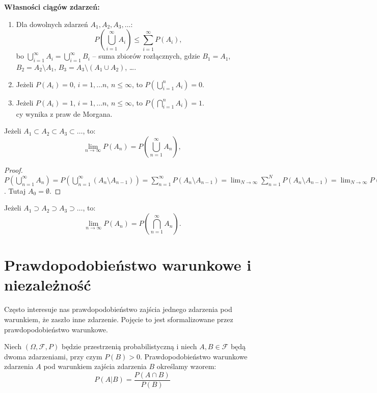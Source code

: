 \documentclass[final,a4paper,openany,12pt]{mwbk}
\begin{document}
\noindent\textbf{Własności ciągów zdarzeń:}
\begin{enumerate}
    \item Dla dowolnych zdarzeń $A_1, A_2, A_3, \dots$:
    \[ P\left(\bigcup_{i=1}^{\infty} A_i\right) \leq \sum_{i=1}^{\infty} P(A_i), \]
    bo $\bigcup_{i=1}^{\infty} A_i = \bigcup_{i=1}^{\infty} B_i$ – suma zbiorów rozłącznych, gdzie
    $B_1 = A_1$, $B_2 = A_2 \setminus A_1$, $B_3 = A_3 \setminus (A_1 \cup A_2)$, \dots.

    \item Jeżeli $P(A_i) = 0$, $i = 1, \dots n$, $n \leq \infty$, to $P\left(\bigcup_{i=1}^{n} A_i\right) = 0$.

    \item Jeżeli $P(A_i) = 1$, $i = 1, \dots n$, $n \leq \infty$, to $P\left(\bigcap_{i=1}^{n} A_i\right) = 1$. \\
    cy wynika z praw de Morgana.
\end{enumerate}

\begin{Tw}
Jeżeli $A_1 \subset A_2 \subset A_3 \subset \dots$, to:
\[ \lim_{n\to\infty} P(A_n) = P\left(\bigcup_{n=1}^{\infty} A_n\right), \]
\end{Tw}
\begin{proof}
$P\left(\bigcup_{n=1}^{\infty} A_n\right) = P\left(\bigcup_{n=1}^{\infty} (A_n \setminus A_{n-1})\right) = \sum_{n=1}^{\infty} P(A_n \setminus A_{n-1}) = \lim_{N\to\infty} \sum_{n=1}^{N} P(A_n \setminus A_{n-1}) = \lim_{N\to\infty} P(A_N)$. Tutaj $A_0 = \emptyset$.
\end{proof}

\begin{Tw}
Jeżeli $A_1 \supset A_2 \supset A_3 \supset \dots$, to:
\[ \lim_{n\to\infty} P(A_n) = P\left(\bigcap_{n=1}^{\infty} A_n\right). \]
\end{Tw}

\section{Prawdopodobieństwo warunkowe i niezależność}
Często interesuje nas prawdopodobieństwo zajścia jednego zdarzenia pod warunkiem, że zaszło inne zdarzenie. Pojęcie to jest sformalizowane przez prawdopodobieństwo warunkowe.

\begin{Def}
    Niech $(\Omega, \mathcal{F}, P)$ będzie przestrzenią probabilistyczną i niech $A, B \in \mathcal{F}$ będą dwoma zdarzeniami, przy czym $P(B) > 0$. Prawdopodobieństwo warunkowe zdarzenia $A$ pod warunkiem zajścia zdarzenia $B$ określamy wzorem:
    $$P(A|B) = \frac{P(A \cap B)}{P(B)}$$
\end{Def}
\end{document}
